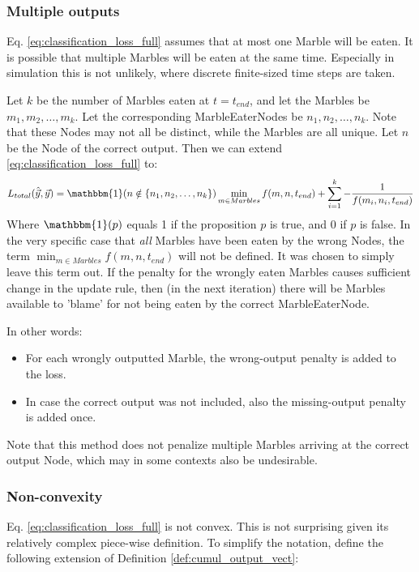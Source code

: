 \subsubsection{Multiple outputs}
Eq. \eqref{eq:classification_loss_full} assumes that at most one Marble will be eaten. It is possible that multiple Marbles will be eaten at the same time. Especially in simulation this is not unlikely, where discrete finite-sized time steps are taken.

Let $k$ be the number of Marbles eaten at $t = t_{end}$, and let the Marbles be $m_1, m_2, \dots, m_k$. Let the corresponding MarbleEaterNodes be $n_1, n_2, \dots, n_k$. Note that these Nodes may not all be distinct, while the Marbles are all unique. Let $n$ be the Node of the correct output. Then we can extend \eqref{eq:classification_loss_full} to:
\begin{equation}
	L_{total}(\hat{\vec{y}}, \vec{y}) = \mathbbm{1}(n\notin \{n_1, n_2, \dots, n_k\}) \min_{m \in Marbles} f(m, n, t_{end}) + \sum_{i=1}^{k}  - \frac{1}{f(m_i, n_i, t_{end})}
\end{equation}
Where $\mathbbm{1}(p)$ equals 1 if the proposition $p$ is true, and 0 if $p$ is false.
In the very specific case that \textit{all} Marbles have been eaten by the wrong Nodes, the term $\min_{m \in Marbles} f(m, n, t_{end})$ will not be defined. It was chosen to simply leave this term out. If the penalty for the wrongly eaten Marbles causes sufficient change in the update rule, then (in the next iteration) there will be Marbles available to 'blame' for not being eaten by the correct MarbleEaterNode.

In other words:
\begin{itemize}
	\item For each wrongly outputted Marble, the wrong-output penalty is added to the loss.
	\item In case the correct output was not included, also the missing-output penalty is added once.
\end{itemize}

Note that this method does not penalize multiple Marbles arriving at the correct output Node, 
which may in some contexts also be undesirable.

\subsubsection{Non-convexity}
Eq. \eqref{eq:classification_loss_full} is not convex. This is not surprising given its relatively complex piece-wise definition. To simplify the notation, define the following extension of Definition \ref{def:cumul_output_vect}:

